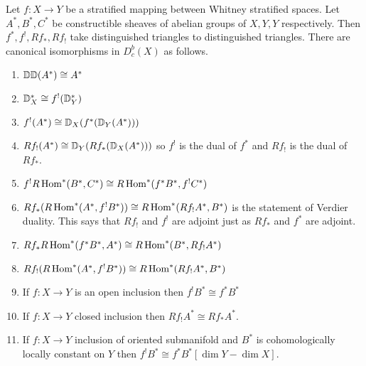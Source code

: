 \documentclass[12pt]{article}
\begin{document}
\begin{theorem}
     Let $f:X\to Y$ be a
    stratified mapping between Whitney stratified spaces. Let $A^*,
        B^*,C^*$ be constructible sheaves of abelian groups of $X,Y,Y$ respectively. Then
    $f^*,f^!,Rf_*,Rf_!$ take distinguished triangles to distinguished triangles. There
    are canonical isomorphisms in $D^b_c(X)$ as follows.

    \begin{enumerate}
        \item $\mathbb{D}\mathbb{D}(A^*) \cong A^*$
        \item $\mathbb{D}^*_X \cong f^!(\mathbb{D}^*_Y)$
        \item $f^!(A^*) \cong \mathbb{D}_X(f^*(\mathbb{D}_Y(A^*)))$
        \item $Rf_!(A^*) \cong \mathbb{D}_Y(Rf_*(\mathbb{D}_X(A^*)))$ so $f^!$ is the dual of $f^*$
              and $Rf_!$ is the dual of $Rf_*$.
        \item $f^!R\operatorname{Hom}^*(B^*,C^*) \cong R\operatorname{Hom}^*(f^*B^*,f^!C^*)$
        \item $Rf_*(R\operatorname{Hom}^*(A^*,f^!B^*)) \cong R\operatorname{Hom}^*(Rf_!A^*,B^*)$ is the statement of Verdier
              duality. This says that $Rf_!$ and $f^!$ are adjoint just as $Rf_*$ and $f^*$ are adjoint.
        \item $Rf_*R\operatorname{Hom}^*(f^*B^*,A^*) \cong R\operatorname{Hom}^*(B^*,Rf_!A^*)$
        \item $Rf_!(R\operatorname{Hom}^*(A^*,f^!B^*)) \cong R\operatorname{Hom}^*(Rf_!A^*,B^*)$
        \item If $f:X\to Y$ is an open inclusion then $f^!B^* \cong f^*B^*$
        \item If $f:X\to Y$ closed inclusion then $Rf_!A^* \cong Rf_*A^*$.
        \item If $f:X\to Y$ inclusion of oriented submanifold and $B^*$ is
              cohomologically locally constant on $Y$ then $f^!B^* \cong f^*B^*[\dim Y - \dim X]$.
    \end{enumerate}
\end{theorem}
\end{document}
